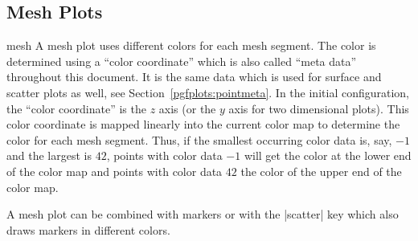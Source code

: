 {\begin{codeexample}[]
\begin{tikzpicture}
\begin{axis}
\end{axis}
\end{tikzpicture}
\end{codeexample}


\subsection{Mesh Plots}
\label{sec:2d:mesh}
\begin{plottype}[/pgfplots]{mesh}
	A mesh plot uses different colors for each mesh segment. The color is determined using a ``color coordinate'' which is also called ``meta data'' throughout this document. It is the same data which is used for surface and scatter plots as well, see Section~\ref{pgfplots:pointmeta}. In the initial configuration, the ``color coordinate'' is the $z$ axis (or the $y$ axis for two dimensional plots). This color coordinate is mapped linearly into the current color map to determine the color for each mesh segment. Thus, if the smallest occurring color data is, say, $-1$ and the largest is $42$, points with color data $-1$ will get the color at the lower end of the color map and points with color data $42$ the color of the upper end of the color map.

\pgfplotsexpensiveexample
\begin{codeexample}[]
\end{codeexample}

	A mesh plot can be combined with markers or with the |scatter| key which also draws markers in different colors.

\pgfplotsexpensiveexample
\begin{codeexample}[]
\end{codeexample}

\pgfplotsexpensiveexample
\begin{codeexample}[]
\end{codeexample}


\end{plottype}}

